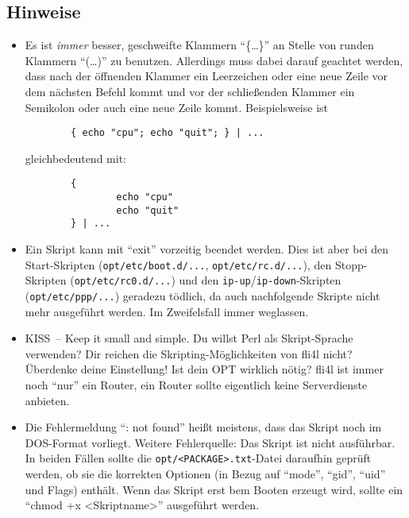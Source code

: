 \subsection{Hinweise}
\begin{itemize}
\item  Es ist \emph{immer} besser, geschweifte Klammern "`\{\ldots\}"' an Stelle von runden
      Klammern "`(\ldots)"' zu benutzen. Allerdings muss dabei darauf geachtet werden,
      dass nach der öffnenden Klammer ein Leerzeichen oder eine neue Zeile vor
      dem nächsten Befehl kommt und vor der schließenden Klammer ein
      Semikolon oder auch eine neue Zeile kommt. Beispielsweise ist

\begin{example}
\begin{verbatim}
        { echo "cpu"; echo "quit"; } | ...
\end{verbatim}
\end{example}

      \noindent gleichbedeutend mit:

\begin{example}
\begin{verbatim}
        {
                echo "cpu"
                echo "quit"
        } | ...
\end{verbatim}
\end{example}


      \item Ein Skript kann mit "`exit"' vorzeitig beendet
        werden. Dies ist aber bei den Start-Skripten (\texttt{opt/etc/boot.d/...},
        \texttt{opt/etc/rc.d/...}), den Stopp-Skripten (\texttt{opt/etc/rc0.d/...}) und den
        \texttt{ip-up}/\texttt{ip-down}-Skripten (\texttt{opt/etc/ppp/...}) geradezu tödlich, da
        auch nachfolgende Skripte nicht mehr ausgeführt werden. Im
        Zweifelsfall immer weglassen.


      \item KISS~-- Keep it small and simple. Du willst Perl als
        Skript-Sprache verwenden? Dir reichen die
        Skripting-Möglichkeiten von fli4l nicht?  Überdenke deine
        Einstellung! Ist dein OPT wirklich nötig? fli4l ist immer noch
        "`nur"' ein Router, ein Router sollte eigentlich keine
        Serverdienste anbieten.


      \item Die Fehlermeldung "`: not found"' heißt meistens, dass das
        Skript noch im DOS-Format vorliegt. Weitere Fehlerquelle: Das
        Skript ist nicht ausführbar. In beiden Fällen sollte die
\texttt{opt/<PACKAGE>.txt}-Datei daraufhin geprüft werden, ob sie die
korrekten Optionen (in Bezug auf "`mode"', "`gid"', "`uid"' und Flags) enthält. Wenn das Skript erst
bem Booten erzeugt wird, sollte ein "`chmod +x <Skriptname>"' ausgeführt
werden.


\end{itemize}
